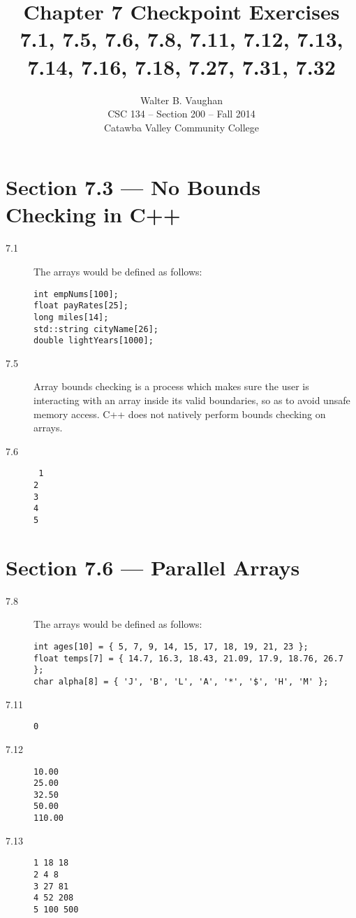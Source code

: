 \documentclass[11pt]{article}
\author{Walter B. Vaughan\\
        \small CSC 134 -- Section 200 -- Fall 2014\\
        \small Catawba Valley Community College}
\title{Chapter 7 Checkpoint Exercises \\
       \footnotesize{7.1, 7.5, 7.6, 7.8, 7.11, 7.12, 7.13, 7.14, 7.16, 7.18, 7.27, 7.31, 7.32}}
\date{\vspace{-5ex}}
\begin{document}
\maketitle


\section*{Section 7.3 --- No Bounds Checking in C++}
\begin{description}
    \item[7.1] The arrays would be defined as follows:
    \begin{lstlisting}
int empNums[100];
float payRates[25];
long miles[14];
std::string cityName[26];
double lightYears[1000];
    \end{lstlisting}
    \item[7.5] Array bounds checking is a process which makes sure the user is interacting with an array inside its valid boundaries, so as to avoid unsafe memory access. C++ does not natively perform bounds checking on arrays.
    \item[7.6] \begin{verbatim}
 1
2
3
4
5
    \end{verbatim}
\end{description}

\section*{Section 7.6 --- Parallel Arrays}
\begin{description}
    \item[7.8] The arrays would be defined as follows:
    \begin{lstlisting}
int ages[10] = { 5, 7, 9, 14, 15, 17, 18, 19, 21, 23 };
float temps[7] = { 14.7, 16.3, 18.43, 21.09, 17.9, 18.76, 26.7 };
char alpha[8] = { 'J', 'B', 'L', 'A', '*', '$', 'H', 'M' };
    \end{lstlisting}
    \item[7.11] \texttt{0}
    \item[7.12] \begin{verbatim}
10.00
25.00
32.50
50.00
110.00
    \end{verbatim}
    \item[7.13] \begin{verbatim}
1 18 18
2 4 8
3 27 81
4 52 208
5 100 500
    \end{verbatim}
\end{description}
\end{document}
